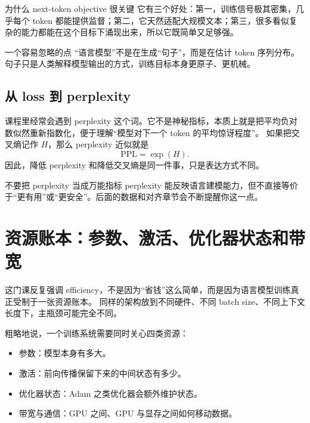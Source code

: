 \documentclass[a4paper]{article}
\begin{document}
\begin{knowledgebox}{为什么 next-token objective 很关键}
它有三个好处：第一，训练信号极其密集，几乎每个 token 都能提供监督；第二，它天然适配大规模文本；第三，很多看似复杂的能力都能在这个目标下涌现出来，所以它既简单又足够强。
\end{knowledgebox}

\begin{importantbox}{一个容易忽略的点}
“语言模型”不是在生成“句子”，而是在估计 token 序列分布。句子只是人类解释模型输出的方式，训练目标本身更原子、更机械。
\end{importantbox}

\subsection{从 loss 到 perplexity}

课程里经常会遇到 perplexity 这个词。它不是神秘指标，本质上就是把平均负对数似然重新指数化，便于理解“模型对下一个 token 的平均惊讶程度”。
如果把交叉熵记作 $H$，那么 perplexity 近似就是
\[
\mathrm{PPL} = \exp(H).
\]
因此，降低 perplexity 和降低交叉熵是同一件事，只是表达方式不同。

\begin{warningbox}{不要把 perplexity 当成万能指标}
perplexity 能反映语言建模能力，但不直接等价于“更有用”或“更安全”。后面的数据和对齐章节会不断提醒你这一点。
\end{warningbox}

\section{资源账本：参数、激活、优化器状态和带宽}

这门课反复强调 efficiency，不是因为“省钱”这么简单，而是因为语言模型训练真正受制于一张资源账本。
同样的架构放到不同硬件、不同 batch size、不同上下文长度下，主瓶颈可能完全不同。

粗略地说，一个训练系统需要同时关心四类资源：
\begin{itemize}
    \item 参数：模型本身有多大。
    \item 激活：前向传播保留下来的中间状态有多少。
    \item 优化器状态：Adam 之类优化器会额外维护状态。
    \item 带宽与通信：GPU 之间、GPU 与显存之间如何移动数据。
\end{itemize}
\end{document}
